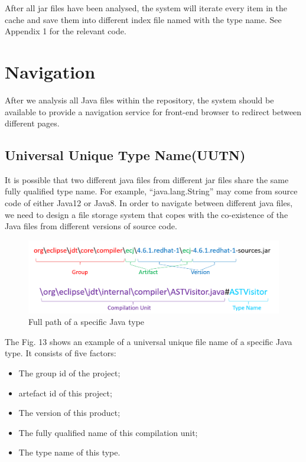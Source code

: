 \documentclass[runningheads]{llncs}
\begin{document}
After all jar files have been analysed, the system will iterate every item in the cache and save them into different index file named with the type name. See Appendix 1 for the relevant code.

\section{Navigation}

After we analysis all Java files within the repository, the system should be available to provide a navigation service for front-end browser to redirect between different pages.

\subsection{Universal Unique Type Name(UUTN)}
It is possible that two different java files from different jar files share the same fully qualified type name. For example, “java.lang.String” may come from source code of either Java12 or Java8. In order to navigate between different java files, we need to design a file storage system that copes with the co-existence of the Java files from different versions of source code.

\begin{figure}[H]
	\centering
	\includegraphics[width=12cm]{pic/GavCuSample.png}
	\caption{Full path of a specific Java type}
	\label{Full path of a specific Java type}
\end{figure}

The Fig. 13 shows an example of a universal unique file name of a specific Java type. It consists of five factors:

\begin{itemize}
	\item The group id of the project;
	\item artefact id of this project;
	\item The version of this product;
	\item The fully qualified name of this compilation unit;
	\item The type name of this type.
\end{itemize}
\end{document}
